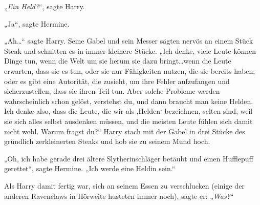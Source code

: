 „\emph{Ein Held?}“, sagte Harry.

„Ja“, sagte Hermine.

„Ah…“ sagte Harry. Seine Gabel und sein Messer sägten nervös an einem Stück Steak und schnitten es in immer kleinere Stücke. „Ich denke, viele Leute können Dinge tun, wenn die Welt um sie herum sie dazu bringt…wenn die Leute erwarten, dass sie es tun, oder sie nur Fähigkeiten nutzen, die sie bereits haben, oder es gibt eine Autorität, die zusieht, um ihre Fehler aufzufangen und sicherzustellen, dass sie ihren Teil tun. Aber solche Probleme werden wahrscheinlich schon gelöst, verstehst du, und dann braucht man keine Helden. Ich denke also, dass die Leute, die wir als ‚Helden‘ bezeichnen, selten sind, weil sie sich alles selbst ausdenken müssen, und die meisten Leute fühlen sich damit nicht wohl. Warum fragst du?“ Harry stach mit der Gabel in drei Stücke des gründlich zerkleinerten Steaks und hob sie zu seinem Mund hoch.

„Oh, ich habe gerade drei ältere Slytherinschläger betäubt und einen Hufflepuff gerettet“, sagte Hermine. „Ich werde eine Heldin sein.“

Als Harry damit fertig war, sich an seinem Essen zu verschlucken (einige der anderen Ravenclaws in Hörweite husteten immer noch), sagte er: „\emph{Was?}“

